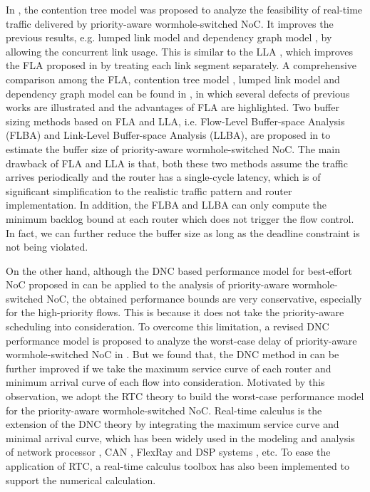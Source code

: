 \documentclass[10pt,journal]{IEEEtran}
\begin{document}
In \cite{LuJS05}, the contention tree model was proposed to analyze the feasibility of real-time traffic delivered by priority-aware wormhole-switched NoC. It improves the previous results, e.g. lumped link model \cite{707545} and dependency graph model \cite{708526}, by allowing the concurrent link usage. This is similar to the LLA \cite{73}, which improves the FLA proposed in \cite{Shi:2008:RCA:1397757.1397996} by treating each link segment separately. A comprehensive comparison among the FLA, contention tree model \cite{LuJS05}, lumped link model \cite{707545} and dependency graph model \cite{708526} can be found in \cite{Shi2009}, in which several defects of previous works \cite{LuJS05}\cite{707545}\cite{708526} are illustrated and the advantages of FLA are highlighted. Two buffer sizing methods based on FLA and LLA, i.e. Flow-Level Buffer-space Analysis (FLBA) and Link-Level Buffer-space Analysis (LLBA), are proposed in \cite{189} to estimate the buffer size of priority-aware wormhole-switched NoC. The main drawback of FLA and LLA is that, both these two methods assume the traffic arrives periodically and the router has a single-cycle latency, which is of significant simplification to the realistic traffic pattern and router implementation. In addition, the FLBA and LLBA can only compute the minimum backlog bound at each router which does not trigger the flow control. In fact, we can further reduce the buffer size as long as the deadline constraint is not being violated.

On the other hand, although the DNC based performance model for best-effort NoC proposed in \cite{qian2009analysis} can be applied to the analysis of priority-aware wormhole-switched NoC, the obtained performance bounds are very conservative, especially for the high-priority flows. This is because it does not take the priority-aware scheduling into consideration. To overcome this limitation, a revised DNC performance model is proposed to analyze the worst-case delay of priority-aware wormhole-switched NoC in \cite{Qian489900}. But we found that, the DNC method in \cite{Qian489900} can be further improved if we take the maximum service curve of each router and minimum arrival curve of each flow into consideration. Motivated by this observation, we adopt the RTC theory \cite{1253607} to build the worst-case performance model for the priority-aware wormhole-switched NoC. Real-time calculus is the extension of the DNC theory \cite{Boudec2001Network} by integrating the maximum service curve and minimal arrival curve, which has been widely used in the modeling and analysis of network processor \cite{1253838}, CAN \cite{4617308}, FlexRay \cite{Hagiescu:2007:PAF:1278480.1278554} and DSP systems \cite{thiele2005performance}, etc. To ease the application of RTC, a real-time calculus toolbox \cite{rtc} has also been implemented to support the numerical calculation.
\end{document}
